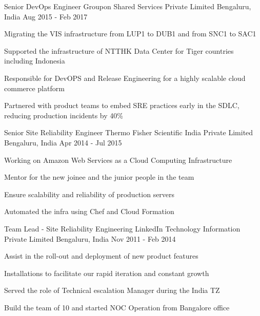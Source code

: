 \begin{cventries}
  \cventry
    {Senior DevOps Engineer} %
    {Groupon Shared Services Private Limited} %
    {Bengaluru, India} %
    {Aug 2015 - Feb 2017} %
    {
      \begin{cvitems} %
        \item {Migrating the VIS infrastructure from LUP1 to DUB1 and from SNC1 to SAC1}
        \item {Supported the infrastructure of NTTHK Data Center for Tiger countries including Indonesia}
        \item {Responsible for DevOPS and Release Engineering for a highly scalable cloud commerce platform}
        \item {Partnered with product teams to embed SRE practices early in the SDLC, reducing production incidents by 40\%}
      \end{cvitems}
    }


  \cventry
    {Senior Site Reliability Engineer} %
    {Thermo Fisher Scientific India Private Limited} %
    {Bengaluru, India} %
    {Apr 2014 - Jul 2015} %
    {
      \begin{cvitems} %
        \item {Working on Amazon Web Services as a Cloud Computing Infrastructure}
        \item {Mentor for the new joinee and the junior people in the team}
        \item {Ensure scalability and reliability of production servers}
        \item {Automated the infra using Chef and Cloud Formation}
      \end{cvitems}
    }


  \cventry
    {Team Lead - Site Reliability Engineering} %
    {LinkedIn Technology Information Private Limited} %
    {Bengaluru, India} %
    {Nov 2011 - Feb 2014} %
    {
      \begin{cvitems} %
        \item {Assist in the roll-out and deployment of new product features}
        \item {Installations to facilitate our rapid iteration and constant growth}
        \item {Served the role of Technical escalation Manager during the India TZ}
        \item {Build the team of 10 and started NOC Operation from Bangalore office}
      \end{cvitems}
    }


\end{cventries}
